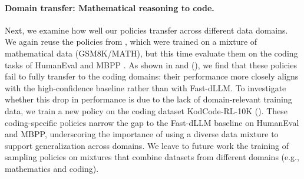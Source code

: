 \paragraph{Domain transfer: Mathematical reasoning to code.}
Next, we examine how well our policies transfer across different data domains.
We again reuse the policies from , which were trained on a mixture of mathematical data (GSM8K/MATH), but this time evaluate them on the coding tasks of HumanEval \citep{chen2021evaluating} and MBPP \citep{austin2021program}.
As shown in  and  (\greenline), we find that these policies fail to fully transfer to the coding domains: their performance more closely aligns with the high-confidence baseline rather than with Fast-dLLM.
To investigate whether this drop in performance is due to the lack of domain-relevant training data,
we train a new policy on the coding dataset KodCode-RL-10K \citep{xu2025kodcode} (\yellowline).
These coding-specific policies narrow the gap to the Fast-dLLM baseline on HumanEval and MBPP, underscoring the importance of using a diverse data mixture to support generalization across domains.
We leave to future work the training of sampling policies on mixtures that combine datasets from different domains (e.g., mathematics and coding).


